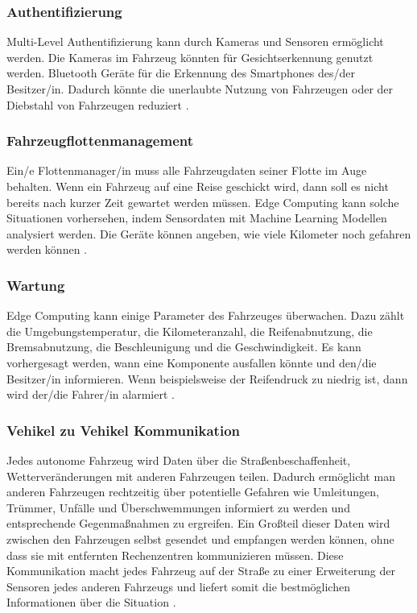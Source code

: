 \documentclass{sigchi}
\begin{document}

\subsubsection{Authentifizierung}
Multi-Level Authentifizierung kann durch Kameras und Sensoren ermöglicht werden. Die Kameras im Fahrzeug könnten für Gesichtserkennung genutzt werden. Bluetooth Geräte für die Erkennung des Smartphones des/der Besitzer/in. Dadurch könnte die unerlaubte Nutzung von Fahrzeugen oder der Diebstahl von Fahrzeugen reduziert \cite{role-edge-computing:2020}.

\subsubsection{Fahrzeugflottenmanagement}
Ein/e Flottenmanager/in muss alle Fahrzeugdaten seiner Flotte im Auge behalten. Wenn ein Fahrzeug auf eine Reise geschickt wird, dann soll es nicht bereits nach kurzer Zeit gewartet werden müssen. Edge Computing kann solche Situationen vorhersehen, indem Sensordaten mit Machine Learning Modellen analysiert werden. Die Geräte können angeben, wie viele Kilometer noch gefahren werden können \cite{role-edge-computing:2020}.

\subsubsection{Wartung}
Edge Computing kann einige Parameter des Fahrzeuges überwachen. Dazu zählt die Umgebungstemperatur, die Kilometeranzahl, die Reifenabnutzung, die Bremsabnutzung, die Beschleunigung und die Geschwindigkeit. Es kann vorhergesagt werden, wann eine Komponente ausfallen könnte und den/die Besitzer/in informieren. Wenn beispielsweise der Reifendruck zu niedrig ist, dann wird der/die Fahrer/in alarmiert \cite{role-edge-computing:2020}.

\subsubsection{Vehikel zu Vehikel Kommunikation}
Jedes autonome Fahrzeug wird Daten über die Straßenbeschaffenheit, Wetterveränderungen mit anderen Fahrzeugen teilen. Dadurch ermöglicht man anderen Fahrzeugen rechtzeitig über potentielle Gefahren wie Umleitungen, Trümmer, Unfälle und Überschwemmungen informiert zu werden und entsprechende Gegenmaßnahmen zu ergreifen. Ein Großteil dieser Daten wird zwischen den Fahrzeugen selbst gesendet und empfangen werden können, ohne dass sie mit entfernten Rechenzentren kommunizieren müssen. Diese Kommunikation macht jedes Fahrzeug auf der Straße zu einer Erweiterung der Sensoren jedes anderen Fahrzeugs und liefert somit die bestmöglichen Informationen über die Situation \cite{5-use-cases:2019}.
\end{document}
